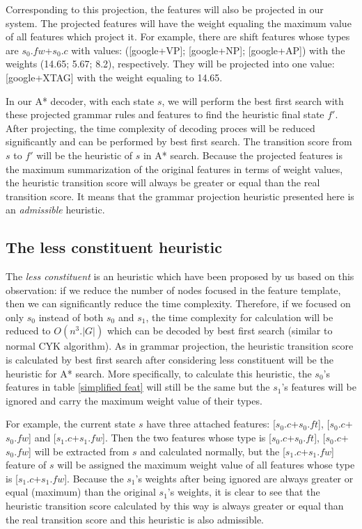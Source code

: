 Corresponding to this projection, the features will also be projected in our system. The projected features will have the weight equaling the maximum value of all features which project it. For example, there are shift features whose types are $s_0.fw$+$s_0.c$ with values: ([google+VP]; [google+NP]; [google+AP]) with the weights (14.65; 5.67; 8.2), respectively. They will be projected into one value: [google+XTAG] with the weight equaling to 14.65.

In our A* decoder, with each state $s$, we will perform the best first search with these projected grammar rules and features to find the heuristic final state $f'$. After projecting, the time complexity of decoding proces will be reduced significantly and can be performed by best first search. The transition score from $s$ to $f'$ will be the heuristic of $s$ in A* search. Because the projected features is the maximum summarization of the original features in terms of weight values, the heuristic transition score will always be greater or equal than the real transition score. It means that the grammar projection heuristic presented here is an \textit{admissible} heuristic.

\subsection{The less constituent heuristic}
The \textit{less constituent} is an heuristic which have been proposed by us based on this observation: if we reduce the number of nodes focused in the feature template, then we can significantly reduce the time complexity. Therefore, if we focused on only $s_0$ instead of both $s_0$ and $s_1$, the time complexity for calculation will be reduced to $O(n^3.|G|)$ which can be decoded by best first search (similar to normal CYK algorithm). As in grammar projection, the heuristic transition score is calculated by best first search after considering less constituent will be the heuristic for A* search. More specifically, to calculate this heuristic, the $s_0$'s features in table \ref{simplified feat} will still be the same but the $s_1$'s features will be ignored and carry the maximum weight value of their types.


For example, the current state $s$ have three attached features: [$s_0.c$+$s_0.ft$], [$s_0.c$+$s_0.fw$] and [$s_1.c$+$s_1.fw$]. Then the two features whose type is [$s_0.c$+$s_0.ft$], [$s_0.c$+$s_0.fw$] will be extracted from $s$ and calculated normally, but the [$s_1.c$+$s_1.fw$] feature of $s$ will be assigned the maximum weight value of all features whose type is [$s_1.c$+$s_1.fw$]. Because the $s_1$'s weights after being ignored are always greater or equal (maximum) than the original $s_1$'s weights, it is clear to see that the heuristic transition score calculated by this way is always greater or equal than the real transition score and this heuristic is also admissible.

